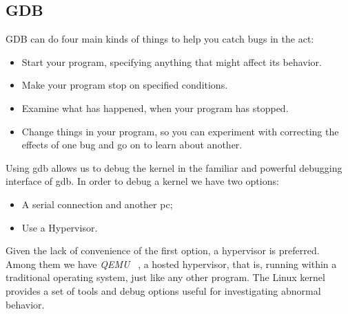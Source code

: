 \documentclass{masterthesis}
\begin{document}
\subsection{GDB}
\label{subsect:gdb}
GDB can do four main kinds of things to help you catch bugs in the act:
\begin{itemize}
\item Start your program, specifying anything that might affect its behavior.
\item Make your program stop on specified conditions.
\item Examine what has happened, when your program has stopped.
\item Change things in your program, so you can experiment with correcting the effects of one bug and go on to learn about another.
\end{itemize}
Using gdb allows us to debug the kernel in the familiar and powerful debugging interface of gdb.
In order to debug a kernel we have two options:
\begin{itemize}
\item A serial connection and another pc;
\item Use a Hypervisor.
\end{itemize}
Given the lack of convenience of the first option, a hypervisor is preferred.
Among them we have \emph{QEMU} ~\cite{bellard2005QEMU}, a hosted hypervisor, that is, running within a traditional operating system, just like any other program.
The Linux kernel provides a set of tools and debug options useful for investigating abnormal behavior.
\end{document}

